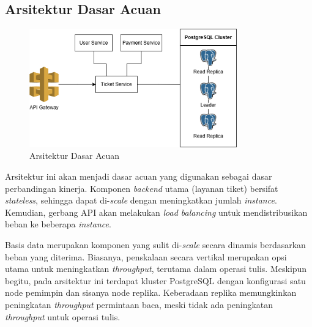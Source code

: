 \subsection{Arsitektur Dasar Acuan}

\begin{figure}[htbp]
    \centering
    \includegraphics[width=0.8\textwidth]{resources/chapter-3/architecture-reference.png}
    \caption{Arsitektur Dasar Acuan}
    \label{fig:baseline-architecture}
\end{figure}

Arsitektur ini akan menjadi dasar acuan yang digunakan sebagai dasar perbandingan kinerja. Komponen \textit{backend} utama (layanan tiket) bersifat \textit{stateless}, sehingga dapat di-\textit{scale} dengan meningkatkan jumlah \textit{instance}. Kemudian, gerbang API akan melakukan \textit{load balancing} untuk mendistribusikan beban ke beberapa \textit{instance}.

Basis data merupakan komponen yang sulit di-\textit{scale} secara dinamis berdasarkan beban yang diterima. Biasanya, penskalaan secara vertikal merupakan opsi utama untuk meningkatkan \textit{throughput}, terutama dalam operasi tulis. Meskipun begitu, pada arsitektur ini terdapat kluster PostgreSQL dengan konfigurasi satu node pemimpin dan sisanya node replika. Keberadaan replika memungkinkan peningkatan \textit{throughput} permintaan baca, meski tidak ada peningkatan \textit{throughput} untuk operasi tulis.